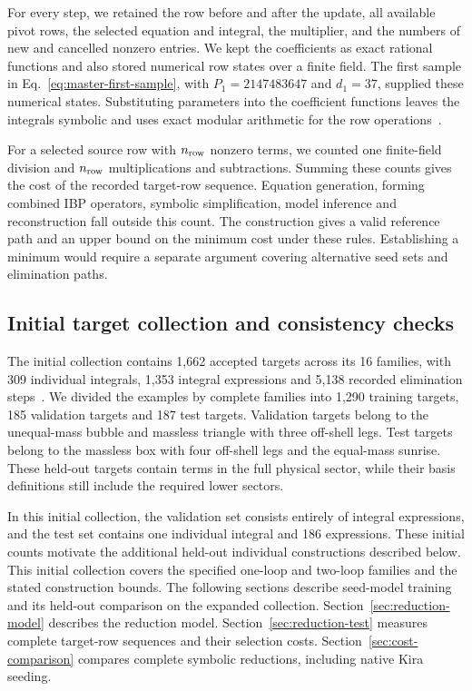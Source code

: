 \documentclass[11pt,a4paper]{article}
\begin{document}
For every step, we retained the row before and after the update,
all available pivot rows, the selected equation and integral, the
multiplier, and the numbers of new and cancelled nonzero entries.
We kept the coefficients as exact rational functions and also stored
numerical row states over a finite field. The first sample in
Eq.~\eqref{eq:master-first-sample}, with $P_1=2147483647$ and $d_1=37$,
supplied these numerical states. Substituting parameters into the
coefficient functions leaves the integrals symbolic and uses exact
modular arithmetic for the row operations~\cite{Kira2}.

For a selected source row with $n_{\rm row}$ nonzero terms, we counted
one finite-field division and $n_{\rm row}$ multiplications and
subtractions. Summing these counts gives the cost of the recorded
target-row sequence. Equation generation, forming combined IBP
operators, symbolic simplification, model inference and reconstruction
fall outside this count. The construction gives a valid reference
path and an upper bound on the minimum cost under these rules.
Establishing a minimum would require a separate argument covering
alternative seed sets and elimination paths.

\subsection{Initial target collection and consistency checks}
The initial collection contains 1,662 accepted targets across its 16 families,
with 309 individual integrals, 1,353 integral expressions and 5,138
recorded elimination steps~\cite{TargetIntegralData}. We divided the
examples by complete families into 1,290 training targets, 185
validation targets and 187 test targets. Validation targets belong
to the unequal-mass bubble and massless triangle with three off-shell
legs. Test targets belong to the massless box with four off-shell
legs and the equal-mass sunrise. These held-out targets contain terms
in the full physical sector, while their basis definitions still
include the required lower sectors.

In this initial collection, the validation set consists entirely of integral
expressions, and the test set contains one individual integral and 186
expressions. These initial counts motivate the additional held-out
individual constructions described below.
This initial collection covers the specified one-loop and two-loop
families and the stated construction bounds. The following sections
describe seed-model training and its held-out comparison on the
expanded collection. Section~\ref{sec:reduction-model} describes the reduction model.
Section~\ref{sec:reduction-test} measures complete target-row sequences
and their selection costs. Section~\ref{sec:cost-comparison} compares complete symbolic reductions, including native Kira seeding.
\end{document}
